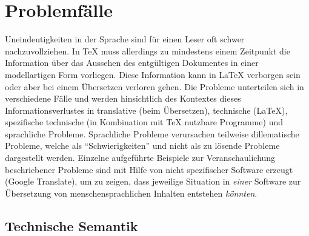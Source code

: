 
\section{Problemfälle}
Uneindeutigkeiten\label{probleme:uneindeutigkeiten} in der Sprache sind für einen Leser oft schwer nachzuvollziehen. In \TeX{} muss allerdings zu mindestens einem Zeitpunkt die Information über das Aussehen des entgültigen Dokumentes in einer modellartigen Form vorliegen. Diese Information kann in \LaTeX{} verborgen sein oder aber bei einem Übersetzen verloren gehen.
Die Probleme unterteilen sich in verschiedene Fälle und werden hinsichtlich des Kontextes dieses Informationsverlustes in translative (beim Übersetzen), technische (\LaTeX{}), spezifische technische (in Kombination mit \TeX{} nutzbare Programme) und sprachliche Probleme. Sprachliche Probleme verursachen teilweise dillematische Probleme,%
welche als \enquote{Schwierigkeiten} und nicht als zu lösende Probleme dargestellt werden. Einzelne aufgeführte Beispiele zur Veranschaulichung beschriebener Probleme sind mit Hilfe von nicht spezifischer Software erzeugt (Google Translate), um zu zeigen, dass jeweilige Situation in \textit{einer} Software zur Übersetzung von menschensprachlichen Inhalten entstehen \textit{könnten}.


\subsection{Technische Semantik}\label{problems:technological}


